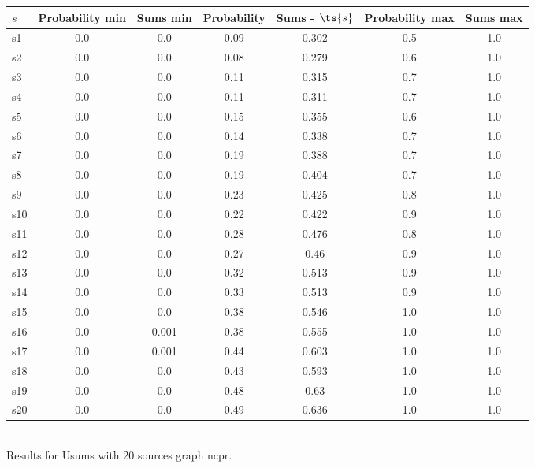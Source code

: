 \documentclass{article}
\begin{document}
\noindent\begin{tabular}{|l|c|c|c|c|c|c|}
\hline
$s$& Probability min & Sums min & Probability & Sums - $\ts{s}$ & Probability max & Sums max\\
\hline
s1 &0.0 & 0.0 & 0.09 & 0.302 & 0.5 & 1.0\\
\hline
s2 &0.0 & 0.0 & 0.08 & 0.279 & 0.6 & 1.0\\
\hline
s3 &0.0 & 0.0 & 0.11 & 0.315 & 0.7 & 1.0\\
\hline
s4 &0.0 & 0.0 & 0.11 & 0.311 & 0.7 & 1.0\\
\hline
s5 &0.0 & 0.0 & 0.15 & 0.355 & 0.6 & 1.0\\
\hline
s6 &0.0 & 0.0 & 0.14 & 0.338 & 0.7 & 1.0\\
\hline
s7 &0.0 & 0.0 & 0.19 & 0.388 & 0.7 & 1.0\\
\hline
s8 &0.0 & 0.0 & 0.19 & 0.404 & 0.7 & 1.0\\
\hline
s9 &0.0 & 0.0 & 0.23 & 0.425 & 0.8 & 1.0\\
\hline
s10 &0.0 & 0.0 & 0.22 & 0.422 & 0.9 & 1.0\\
\hline
s11 &0.0 & 0.0 & 0.28 & 0.476 & 0.8 & 1.0\\
\hline
s12 &0.0 & 0.0 & 0.27 & 0.46 & 0.9 & 1.0\\
\hline
s13 &0.0 & 0.0 & 0.32 & 0.513 & 0.9 & 1.0\\
\hline
s14 &0.0 & 0.0 & 0.33 & 0.513 & 0.9 & 1.0\\
\hline
s15 &0.0 & 0.0 & 0.38 & 0.546 & 1.0 & 1.0\\
\hline
s16 &0.0 & 0.001 & 0.38 & 0.555 & 1.0 & 1.0\\
\hline
s17 &0.0 & 0.001 & 0.44 & 0.603 & 1.0 & 1.0\\
\hline
s18 &0.0 & 0.0 & 0.43 & 0.593 & 1.0 & 1.0\\
\hline
s19 &0.0 & 0.0 & 0.48 & 0.63 & 1.0 & 1.0\\
\hline
s20 &0.0 & 0.0 & 0.49 & 0.636 & 1.0 & 1.0\\
\hline
\end{tabular}\\

\noindent Results for Usums with 20 sources graph ncpr.
\end{document}
